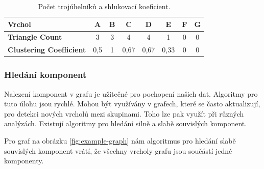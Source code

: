 \documentclass[
  program=infoi,
  biblatex=true,
  sourcecodes=true,
  figures=true,
  glossaries=false,
  index
]{kidiplom}
\begin{document}
\begin{table}[h]
\begin{center}
\caption{Počet trojúhelníků a shlukovací koeficient.}
\label{tab:triangles}
\begin{tabular}{ | l || c | c | c | c | c | c | c | }
 \hline
 \textbf{Vrchol} & A & B & C & D & E & F & G \\
 \hline
 \textbf{Triangle Count} & 3 & 3 & 4 & 4 & 1 & 0 & 0 \\
 \hline
 \textbf{Clustering Coefficient} & 0,5 & 1 & 0,67 & 0,67 & 0,33 & 0 & 0 \\
 \hline
\end{tabular}
\end{center}
\end{table}

\subsubsection{Hledání komponent}
Nalezení komponent v grafu je užitečné pro pochopení našich dat. Algoritmy pro tuto úlohu jsou rychlé. Mohou být využívány v grafech, které se často aktualizují, pro detekci nových vrcholů mezi skupinami. Toho lze pak využít při různých analýzách. Existují algoritmy pro hledání silně a slabě souvislých komponent.

Pro graf na obrázku \ref{fig:example-graph} nám algoritmus pro hledání slabě souvislých komponent vrátí, že všechny vrcholy grafu jsou součástí jedné komponenty.
\end{document}
